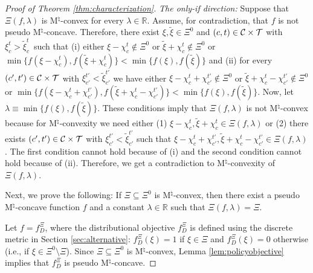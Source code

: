 \documentclass[12pt]{amsart}
\theoremstyle{remark}
\newcommand{\mby}[1]{{\color{blue} MBY: #1 }}
\begin{document}
\begin{proof}[Proof of Theorem \ref{thm:characterization}]
\medskip
\noindent
\emph{The only-if direction:} Suppose that $\Xi(f,\lambda)$ is M$^{\natural}$-convex for every $\lambda\in \mathbb{R}$.
Assume, for contradiction, that $f$ is not pseudo M$^{\natural}$-concave. Therefore, there exist
$\xi,\tilde{\xi} \in \Xi^0$ and $(c,t)\in \mathcal{C} \times \mathcal{T}$ with $\xi_c^t>\tilde{\xi}_c^t \,$ such that
(i) either $\xi-\chi_c^t \notin \Xi^0$ or $\tilde{\xi}+\chi_c^t \notin \Xi^0$ or $\min \{f(\xi-\chi_c^t), f(\tilde{\xi}+\chi_c^t)\} < \min \{f(\xi),f(\tilde{\xi})\}$
and (ii) for every $(c',t')\in \mathcal{C} \times \mathcal{T}$ with $\xi_{c'}^{t'}<\tilde{\xi}_{c'}^{t'}$ we have either
$\xi-\chi_c^t+\chi_{c'}^{t'} \notin \Xi^0$ or $\tilde{\xi}+\chi_c^t-\chi_{c'}^{t'} \notin \Xi^0$ or
$\min \{f(\xi-\chi_c^t+\chi_{c'}^{t'}), f(\tilde{\xi}+\chi_c^t-\chi_{c'}^{t'})\} < \min \{f(\xi),f(\tilde{\xi})\}$. Now, let $\lambda \equiv \min\{f(\xi),f(\tilde{\xi})\}$. These conditions imply that $\Xi(f,\lambda)$ is not M$^{\natural}$-convex because for M$^{\natural}$-convexity we need either (1) $\xi-\chi_c^t, \tilde{\xi}+\chi_c^t \in \Xi(f,\lambda)$ or (2) there exists $(c',t')\in \mathcal{C} \times \mathcal{T}$ with $\xi_{c'}^{t'}<\tilde{\xi}_{c'}^{t'}$ such that
$\xi-\chi_c^t+\chi_{c'}^{t'},\tilde{\xi}+\chi_c^t-\chi_{c'}^{t'}\in \Xi(f,\lambda)$. The first condition cannot hold because of (i) and the second condition
cannot hold because of (ii). Therefore, we get a contradiction to M$^{\natural}$-convexity of $\Xi(f,\lambda)$.
\medskip

Next, we prove the following: If $\Xi\subseteq \Xi^0$ is M$^{\natural}$-convex, then there exist a pseudo M$^{\natural}$-concave function
$f$ and a constant $\lambda \in \mathbb{R}$ such that $\Xi(f,\lambda)=\Xi$.

Let $f=f^{\Xi}_D$, where the distributional objective $f^{\Xi}_D$ is defined using the discrete metric in Section \ref{sec:alternative}:
$f^{\Xi}_D(\xi)=1$ if $\xi \in \Xi$ and $f^{\Xi}_D(\xi)=0$ otherwise (i.e., if $\xi\in \Xi^0 \setminus \Xi$). Since
$\Xi \subseteq \Xi^0$ is M$^{\natural}$-convex, Lemma \ref{lem:policyobjective} implies that
$f^{\Xi}_D$ is pseudo M$^{\natural}$-concave.

\begin{comment} \mby: We don't need to show pseudo M$^{\natural}$-concavity here again.
First, we show that $f$ is pseudo M$^{\natural}$-concave. Consider $\xi,\tilde{\xi} \in \Xi$ and $(c,t)\in \calc \times \calt$ with
$\xi_c^t>\tilde{\xi}_c^t \,$. By definition, $f(\xi)=f(\tilde{\xi})=1$.
Since $\Xi$ is M$^{\natural}$-convex, we have, either (i) $\xi-\chi_c^t \in \Xi$ and $\tilde{\xi}+\chi_c^t \in \Xi$, or (ii) there
exists $(c',t')\in \calc \times \calt$ such that $\xi-\chi_c^t+\chi_{c'}^{t'}, \tilde{\xi}+\chi_c^t-\chi_{c'}^{t'} \in \Xi $.
By the construction of $f$, we either have $f(\xi-\chi_c^t) = f(\tilde{\xi}+\chi_c^t) = 1$ or $f(\xi-\chi_c^t+\chi_{c'}^{t'})=f(\tilde{\xi}+\chi_c^t-\chi_{c'}^{t'})=1$.
Therefore, $f$ is pseudo M$^{\natural}$-concave.
\end{comment}



\end{proof}
\end{document}

